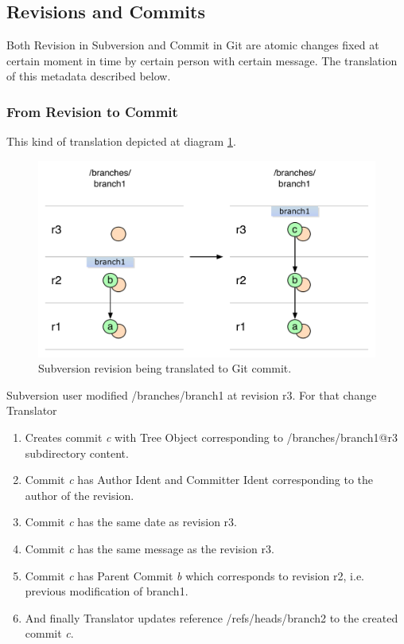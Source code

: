 \subsection{Revisions and Commits}

Both Revision in Subversion and Commit in Git are atomic changes fixed at certain moment in time by certain person with certain message. The translation of this metadata described below.

\subsubsection{From Revision to Commit}

This kind of translation depicted at diagram \ref{single_change_svn_to_git}.

\begin{figure}[!h]
\centering
\renewcommand{\figurename}{Diagram}
\includegraphics[width=\linewidth]{img/diagrams/single_change_svn_to_git.pdf}
\caption{Subversion revision being translated to Git commit.}
\label{single_change_svn_to_git}
\end{figure}

Subversion user modified /branches/branch1 at revision r3. For that change Translator
\begin{enumerate}
	\item Creates commit \emph{c} with Tree Object corresponding to /branches/branch1@r3 subdirectory content.
	\item Commit \emph{c} has Author Ident and Committer Ident corresponding to the author of the revision.
	\item Commit \emph{c} has the same date as revision r3.
	\item Commit \emph{c} has the same message as the revision r3.
	\item Commit \emph{c} has Parent Commit \emph{b} which corresponds to revision r2, i.e. previous modification of branch1.
	\item And finally Translator updates reference /refs/heads/branch2 to the created commit \emph{c}.
\end{enumerate}

